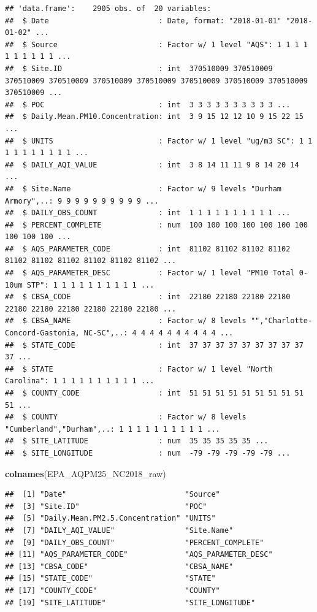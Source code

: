 \documentclass[12pt,]{article}
\newenvironment{Shaded}{\begin{snugshade}}{\end{snugshade}}
\newcommand{\KeywordTok}[1]{\textcolor[rgb]{0.13,0.29,0.53}{\textbf{#1}}}
\newcommand{\NormalTok}[1]{#1}
\begin{document}
\begin{verbatim}
## 'data.frame':    2905 obs. of  20 variables:
##  $ Date                         : Date, format: "2018-01-01" "2018-01-02" ...
##  $ Source                       : Factor w/ 1 level "AQS": 1 1 1 1 1 1 1 1 1 1 ...
##  $ Site.ID                      : int  370510009 370510009 370510009 370510009 370510009 370510009 370510009 370510009 370510009 370510009 ...
##  $ POC                          : int  3 3 3 3 3 3 3 3 3 3 ...
##  $ Daily.Mean.PM10.Concentration: int  3 9 15 12 12 10 9 15 22 15 ...
##  $ UNITS                        : Factor w/ 1 level "ug/m3 SC": 1 1 1 1 1 1 1 1 1 1 ...
##  $ DAILY_AQI_VALUE              : int  3 8 14 11 11 9 8 14 20 14 ...
##  $ Site.Name                    : Factor w/ 9 levels "Durham Armory",..: 9 9 9 9 9 9 9 9 9 9 ...
##  $ DAILY_OBS_COUNT              : int  1 1 1 1 1 1 1 1 1 1 ...
##  $ PERCENT_COMPLETE             : num  100 100 100 100 100 100 100 100 100 100 ...
##  $ AQS_PARAMETER_CODE           : int  81102 81102 81102 81102 81102 81102 81102 81102 81102 81102 ...
##  $ AQS_PARAMETER_DESC           : Factor w/ 1 level "PM10 Total 0-10um STP": 1 1 1 1 1 1 1 1 1 1 ...
##  $ CBSA_CODE                    : int  22180 22180 22180 22180 22180 22180 22180 22180 22180 22180 ...
##  $ CBSA_NAME                    : Factor w/ 8 levels "","Charlotte-Concord-Gastonia, NC-SC",..: 4 4 4 4 4 4 4 4 4 4 ...
##  $ STATE_CODE                   : int  37 37 37 37 37 37 37 37 37 37 ...
##  $ STATE                        : Factor w/ 1 level "North Carolina": 1 1 1 1 1 1 1 1 1 1 ...
##  $ COUNTY_CODE                  : int  51 51 51 51 51 51 51 51 51 51 ...
##  $ COUNTY                       : Factor w/ 8 levels "Cumberland","Durham",..: 1 1 1 1 1 1 1 1 1 1 ...
##  $ SITE_LATITUDE                : num  35 35 35 35 35 ...
##  $ SITE_LONGITUDE               : num  -79 -79 -79 -79 -79 ...
\end{verbatim}

\begin{Shaded}
\begin{Highlighting}[]
\KeywordTok{colnames}\NormalTok{(EPA_AQPM25_NC2018_raw)}
\end{Highlighting}
\end{Shaded}

\begin{verbatim}
##  [1] "Date"                           "Source"                        
##  [3] "Site.ID"                        "POC"                           
##  [5] "Daily.Mean.PM2.5.Concentration" "UNITS"                         
##  [7] "DAILY_AQI_VALUE"                "Site.Name"                     
##  [9] "DAILY_OBS_COUNT"                "PERCENT_COMPLETE"              
## [11] "AQS_PARAMETER_CODE"             "AQS_PARAMETER_DESC"            
## [13] "CBSA_CODE"                      "CBSA_NAME"                     
## [15] "STATE_CODE"                     "STATE"                         
## [17] "COUNTY_CODE"                    "COUNTY"                        
## [19] "SITE_LATITUDE"                  "SITE_LONGITUDE"
\end{verbatim}
\end{document}
